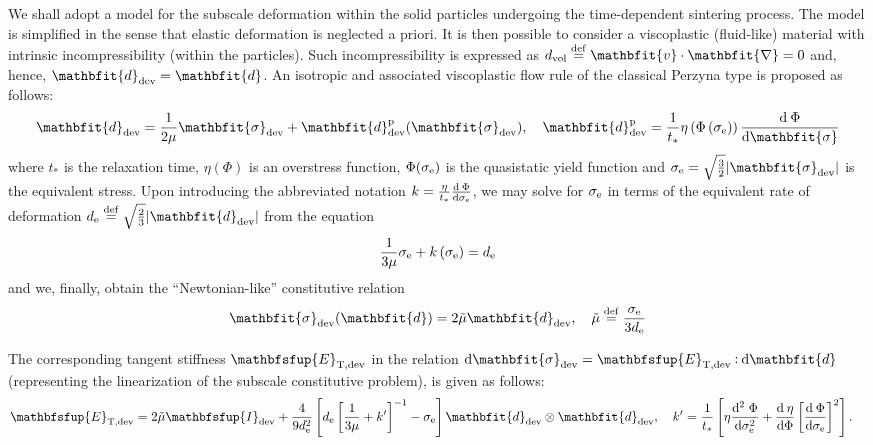 \documentclass[12pt,a4paper,fleqn]{article}
\renewcommand{\ta}[1]{\mathbfit{#1}}
\renewcommand{\ts}[1]{\mathbfit{#1}}
\renewcommand{\tf}[1]{\mathbfsfup{#1}}
\newcommand{\tang}{\mathrm{T}}
\begin{document}
We shall adopt a model for the subscale deformation within the solid particles undergoing the time-dependent sintering process. The model is simplified in the sense that elastic deformation is neglected a priori. It is then possible to consider a viscoplastic (fluid-like) material with intrinsic incompressibility (within the particles). Such incompressibility is expressed as $d_\vol\defeq\ta{v}\cdot\ts{\nabla}=0$ and, hence, $\ts{d}_\dev=\ts{d}$. An isotropic and associated viscoplastic flow rule of the classical Perzyna type is proposed as follows:
\begin{equation}
    \ts{d}_\dev = \frac{1}{2\mu}\ts{\sigma}_\dev + \ts{d}_\dev^\pl(\ts{\sigma}_\dev), \quad
    \ts{d}_\dev^\pl = \frac{1}{t_*}\eta\left(\Phi\left(\sigma_\eqv\right)\right)\od{\Phi}{\ts\sigma}
\label{eq201}
\end{equation}
where $t_*$ is the relaxation time, $\eta(\Phi)$ is an overstress function, $\Phi(\sigma_{\mathrm{e}})$ is the quasistatic yield function and $\sigma_\eqv=\sqrt{\frac{3}{2}}|\ts{\sigma}_\dev|$ is the equivalent stress. Upon introducing the abbreviated notation $k=\frac{\eta}{t_*}\frac{\operatorname{d \!}\:\Phi}{\operatorname{d \!} \sigma_{\mathrm{e}}}$, we may solve for $\sigma_{\mathrm{e}}$ in terms of the equivalent rate of deformation $d_\eqv\defeq\sqrt{\frac{2}{3}}|\ts{d}_\dev|$ from the equation
\begin{equation}
    \frac{1}{3\mu}\sigma_{\mathrm{e}} + k\left(\sigma_{\mathrm{e}}\right) = d_{\mathrm{e}}
\label{eq202}
\end{equation}
and we, finally, obtain the ``Newtonian-like'' constitutive relation
\begin{equation}
    \ts{\sigma}_\dev(\ts{d}) = 2\tilde{\mu}\ts{d}_\dev, \quad
    \tilde{\mu}\defeq \frac{\sigma_\eqv}{3d_\eqv}
\label{eq203}
\end{equation}

The corresponding tangent stiffness $\tf{E}_{\tang,\dev}$ in the relation $\dif\ts{\sigma}_\dev=\tf{E}_{\tang,\dev}\dprod\dif\ts{d}$ (representing the linearization of the subscale constitutive problem), is given as follows:
\begin{align}
 \tf E_{\tang,\dev} &= 2\tilde{\mu} \tf I_\dev + \frac{4}{9 d_\eqv^2} \left[ d_\eqv \left[ \frac{1}{3\mu} + k' \right]^{-1} - \sigma_\eqv \right] \ts d_\dev \outerp\ts d_\dev
 ,\quad k' = \frac{1}{t_*}\left[\eta \frac{\mathrm{d}^2\;\Phi}{\dif\sigma_\eqv^2} + \od{\eta}{\Phi}\left[\od{\Phi}{\sigma_\eqv}\right]^2\right].
\end{align}
\end{document}
